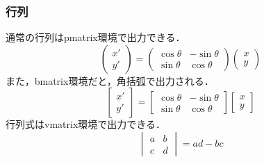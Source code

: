 \documentclass[a4j,titlepage,dvipdfmx,uplatex]{jsarticle}   %
\begin{document}
\subsubsection{行列}
通常の行列はpmatrix環境で出力できる．
\begin{equation*}
  \begin{pmatrix}
    x' \\ y'
  \end{pmatrix}
  =
  \begin{pmatrix}
    \cos\theta & -\sin\theta \\
    \sin\theta & \cos\theta
  \end{pmatrix}
  \begin{pmatrix}
    x \\ y
  \end{pmatrix}
\end{equation*}
また，bmatrix環境だと，角括弧で出力される．
\begin{equation*}
  \begin{bmatrix}
    x' \\ y'
  \end{bmatrix}
  =
  \begin{bmatrix}
    \cos\theta & -\sin\theta \\
    \sin\theta & \cos\theta
  \end{bmatrix}
  \begin{bmatrix}
    x \\ y
  \end{bmatrix}
\end{equation*}
行列式はvmatrix環境で出力できる．
\begin{equation*}
\begin{vmatrix}
  a & b \\
  c & d
\end{vmatrix}
= ad - bc
\end{equation*}
\end{document}
